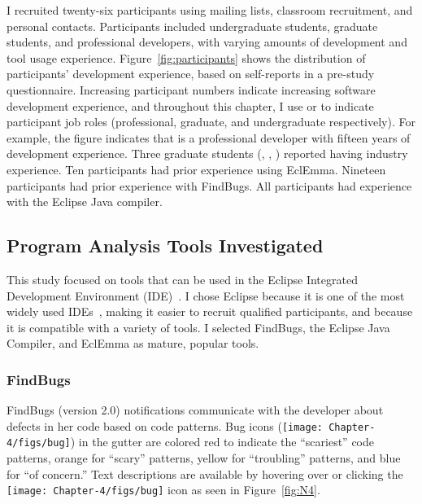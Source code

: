 I recruited twenty-six participants using mailing lists, classroom recruitment, and personal
contacts. Participants included undergraduate students, graduate students, and
professional developers, with varying amounts of development and tool
usage experience. Figure~\ref{fig:participants} shows the distribution of
participants' development experience, based on self-reports in a pre-study
questionnaire. 
Increasing participant numbers indicate increasing software development experience,
and throughout this chapter, I use  or  
 to indicate participant job roles (professional, graduate, and undergraduate respectively).
For example, the figure indicates that  is a professional developer with fifteen years of development experience. 
Three graduate students (, , ) reported having industry experience.
Ten participants had prior experience using EclEmma. 
Nineteen participants had prior experience with FindBugs. 
All participants had experience with the Eclipse Java compiler.

\subsection{Program Analysis Tools Investigated} \label{TUI}

This study focused on tools that can be used in the Eclipse
Integrated Development Environment (IDE)~\cite{EclipseIDE}. 
I chose Eclipse because it is one of the most widely used IDEs~\cite{Goth:2005:Beware}, 
making it easier to recruit qualified participants,
and because it is compatible with a variety of tools. I selected FindBugs, the Eclipse Java Compiler, and
EclEmma as mature, popular tools.


\subsubsection*{FindBugs}

FindBugs (version 2.0) notifications communicate with the developer about defects in her
code based on code patterns. Bug icons (\texttt{[image: Chapter-4/figs/bug]}) in the gutter are colored red
to indicate the ``scariest'' code patterns, orange for ``scary'' patterns, yellow
for ``troubling'' patterns, and blue for ``of concern.'' Text descriptions are
available by hovering over or clicking the \texttt{[image: Chapter-4/figs/bug]} icon as seen in Figure~\ref{fig:N4}.

